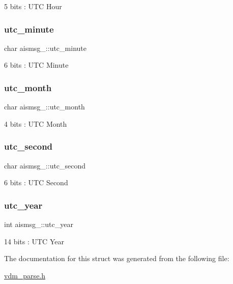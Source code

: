 5 bits \+: U\+TC Hour 

\mbox{\label{structaismsg__11_a6eb48cd12b8e839a768109d820489fa1}} 
\subsubsection{\texorpdfstring{utc\+\_\+minute}{utc\_minute}}
{\footnotesize\ttfamily char aismsg\+\_\+::utc\+\_\+minute}



6 bits \+: U\+TC Minute 

\mbox{\label{structaismsg__11_afd9f140978135b126a665329aeabe091}} 
\subsubsection{\texorpdfstring{utc\+\_\+month}{utc\_month}}
{\footnotesize\ttfamily char aismsg\+\_\+::utc\+\_\+month}



4 bits \+: U\+TC Month 

\mbox{\label{structaismsg__11_a5aad3a20977f8a95a9c79f459a6e89f0}} 
\subsubsection{\texorpdfstring{utc\+\_\+second}{utc\_second}}
{\footnotesize\ttfamily char aismsg\+\_\+::utc\+\_\+second}



6 bits \+: U\+TC Second 

\mbox{\label{structaismsg__11_a5472f5812abca6419dec0a21bb8729bf}} 
\subsubsection{\texorpdfstring{utc\+\_\+year}{utc\_year}}
{\footnotesize\ttfamily int aismsg\+\_\+::utc\+\_\+year}



14 bits \+: U\+TC Year 



The documentation for this struct was generated from the following file\+:\begin{DoxyCompactItemize}
\item 
\mbox{\hyperlink{vdm__parse_8h}{vdm\+\_\+parse.\+h}}\end{DoxyCompactItemize}
